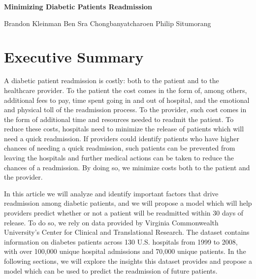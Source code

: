 \documentclass{article}
\begin{document}
\clearpage
\vspace*{\fill}

\begin{minipage}{.6\textwidth}
\textbf{Minimizing Diabetic Patients Readmission} \newline

\medskip
Brandon Kleinman\newline
Ben Sra Chongbanyatcharoen\newline
Philip Situmorang\newline
\end{minipage}

\vfill 
\clearpage

\newpage
\tableofcontents
\newpage
\section{Executive Summary}
A diabetic patient readmission is costly: both to the patient and to the healthcare provider. To the patient the cost comes in the form of, among others, additional fees to pay, time spent going in and out of hospital, and the emotional and physical toll of the readmission process. To the provider, such cost comes in the form of additional time and resources needed to readmit the patient. To reduce these costs, hospitals need to minimize the release of patients which will need a quick readmission. If providers could identify patients who have higher chances of needing a quick readmission, such patients can be prevented from leaving the hospitals and further medical actions can be taken to reduce the chances of a readmission. By doing so, we minimize costs both to the patient and the provider.\newline

In this article we will analyze and identify important factors that drive readmission among diabetic patients, and we will propose a model which will help providers predict whether or not a patient will be readmitted within 30 days of release. To do so, we rely on data provided by Virginia Commonwealth University's Center for Clinical and Translational Research. The dataset contains information on diabetes patients across 130 U.S. hospitals from 1999 to 2008,  with over 100,000 unique hospital admissions and 70,000 unique patients. In the following sections, we will explore the insights this dataset provides and propose a model which can be used to predict the readmission of future patients. \newline

\end{document}
